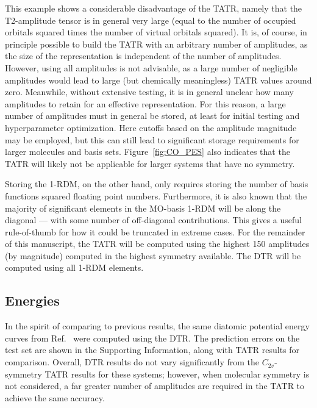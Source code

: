 This example shows a considerable disadvantage of the TATR, namely that the T2-amplitude tensor is in general very large 
(equal to the number of occupied orbitals squared times the number of virtual orbitals squared). It is, of course, in principle possible to build the TATR with an arbitrary number of amplitudes, as the size of the representation is independent of the number of amplitudes. However, using all amplitudes is not advisable, as a large number of negligible amplitudes would lead to large (but chemically meaningless) TATR values around zero. Meanwhile, without extensive testing, it is in general unclear how many amplitudes to retain for an effective representation. For this reason, a large number of amplitudes must in general be stored, at least for initial testing and hyperparameter optimization. Here cutoffs based on the amplitude magnitude may be employed, but this can still lead to significant storage requirements for larger molecules and basis sets. Figure~\ref{fig:CO_PES} also indicates that the TATR will likely not be applicable for larger systems that have no symmetry.
 
Storing the 1-RDM, on the other hand, only requires storing the number of basis functions squared floating point numbers. Furthermore, it is also known that the majority of significant elements in the MO-basis 1-RDM will be along the diagonal --- with some number of off-diagonal contributions. %
This gives a useful rule-of-thumb for how it could be truncated in extreme cases.
For the remainder of this manuscript, the TATR will be computed using the highest 150 amplitudes (by magnitude) computed in the highest symmetry available. The DTR will be computed using all 1-RDM elements.

\subsection{Energies} \label{energy}
In the spirit of comparing to previous results, the same diatomic potential energy curves from Ref.~ were computed using the DTR. The prediction errors on the test set are shown in the Supporting Information, along with TATR results for comparison.
 Overall, DTR results do not vary significantly from the $C_{2v}$-symmetry TATR results for these systems; however, when molecular symmetry is not considered, a far greater number of amplitudes are required in the TATR to achieve the same accuracy.

